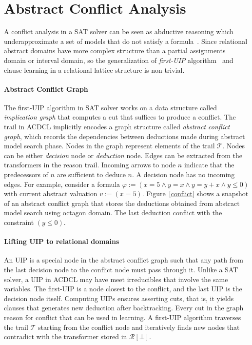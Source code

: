 \section{Abstract Conflict Analysis}
A conflict analysis in a SAT solver can be seen as abductive 
reasoning which underapproximate a set of models that do not satisfy a 
formula~\cite{sas12,dhk2013-popl}.  
Since relational abstract domains have more complex structure than a partial 
assignments domain or interval domain, so the generalization of {\em first-UIP} algorithm~\cite{uip} and clause learning in a relational lattice structure is non-trivial. 

\paragraph {\textbf{Abstract Conflict Graph}}
The first-UIP algorithm in SAT solver works on a data structure called 
{\em implication graph} that computes a cut that suffices to produce a 
conflict.  The trail in ACDCL implicitly encodes a graph structure called 
{\em abstract conflict graph}, which records the dependencies between 
deductions made during abstract model search phase.  Nodes in the graph 
represent elements of the trail $\mathcal{T}$.  Nodes can be either 
{\em decision} node or {\em deduction} node. Edges can be extracted from
the transformers in the reason trail.  Incoming arrows to node $n$ 
indicate that the predecessors of $n$ are sufficient to deduce $n$.  
A decision node has no incoming edges.  
For example, consider a formula 
$\varphi:= (x=5 \wedge y=x \wedge y=y+x \wedge y \leq 0)$ with current 
abstract valuation $v:= (x=5)$.  Figure~\ref{conflict} shows a 
snapshot of an abstract conflict graph that 
stores the deductions obtained from abstract model search using octagon domain.  
The last deduction conflict with the constraint $(y \leq 0)$.  

\paragraph {\textbf{Lifting UIP to relational domains}}
An UIP is a special node in the abstract conflict graph such that 
any path from the last decision node to the conflict node must pass 
through it.  Unlike a SAT solver, a UIP in ACDCL may have meet irreducibles 
that involve the same variables.  The first-UIP is a node closest  to the 
conflict, and the last UIP is the decision node itself.  Computing UIPs ensures 
asserting cuts, that is, it yields clauses that generates new deduction after 
backtracking.  Every cut in the graph reason for conflict that can be used in learning.  
A first-UIP algorithm traverses the trail $\mathcal{T}$ starting from the 
conflict node and iteratively finds new nodes that contradict  with the 
transformer stored in $\mathcal{R}[\bot]$.  

